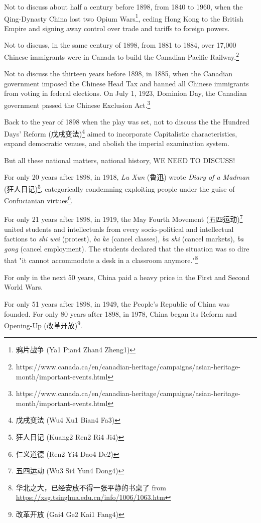 \documentclass[8pt]{article}
\begin{document}
Not to discuss about half a century before 1898, from 1840 to 1960, when the Qing-Dynasty China lost two Opium Wars\footnote{鸦片战争 (Ya1 Pian4 Zhan4 Zheng1)}, ceding Hong Kong to the British Empire and signing away control over trade and tariffs to foreign powers.

Not to discuss, in the same century of 1898, from 1881 to 1884, over 17,000 Chinese immigrants were in Canada to build the Canadian Pacific Railway.\footnote{https://www.canada.ca/en/canadian-heritage/campaigns/asian-heritage-month/important-events.html}

Not to discuss the thirteen years before 1898, in 1885, when the Canadian government imposed the Chinese Head Tax and banned all Chinese immigrants from voting in federal elections. On July 1, 1923, Dominion Day, the Canadian government passed the Chinese Exclusion Act.\footnote{https://www.canada.ca/en/canadian-heritage/campaigns/asian-heritage-month/important-events.html}


Back to the year of 1898 when the play was set, not to discuss the the Hundred Days' Reform (戊戌变法)\footnote{戊戌变法 (Wu4 Xu1 Bian4 Fa3)} aimed to incorporate Capitalistic characteristics, expand democratic venues, and abolish the imperial examination system.

But all these national matters, national history, WE NEED TO DISCUSS!

For only 20 years after 1898, in 1918, \textit{Lu Xun} (鲁迅) wrote \textit{Diary of a Madman} (狂人日记)\footnote{狂人日记 (Kuang2 Ren2 Ri4 Ji4)}, categorically condemning exploiting people under the guise of Confucianian virtues\footnote{仁义道德 (Ren2 Yi4 Dao4 De2)}.

For only 21 years after 1898, in 1919, the May Fourth Movement (五四运动)\footnote{五四运动 (Wu3 Si4 Yun4 Dong4)} united students and intellectuals from every socio-political and intellectual factions to \textit{shi wei} (protest), \textit{ba ke} (cancel classes), \textit{ba shi} (cancel markets), \textit{ba gong} (cancel employment). The students declared that the situation was so dire that "it cannot accommodate a desk in a classroom anymore."\footnote{华北之大，已经安放不得一张平静的书桌了 from \href{https://xsg.tsinghua.edu.cn/info/1006/1063.htm}{https://xsg.tsinghua.edu.cn/info/1006/1063.htm}}

For only in the next 50 years, China paid a heavy price in the First and Second World Wars.

For only 51 years after 1898, in 1949, the People's Republic of China was founded. For only 80 years after 1898, in 1978, China began its Reform and Opening-Up (改革开放)\footnote{改革开放 (Gai4 Ge2 Kai1 Fang4)}.
\end{document}
